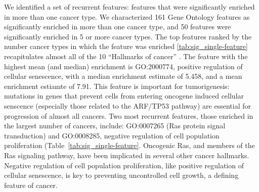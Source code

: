 We identified a set of recurrent features: features that were significantly enriched in more than one cancer type.  We characterized 161 Gene Ontology features as significantly enriched in more than one cancer type, and 50 features were significantly enriched in 5 or more cancer types.  The top features ranked by the number cancer types in which the feature was enriched \ref{tab:sig_single-feature} recapitulates almost all of the 10 ``Hallmarks of cancer''
\cite{Hanahan_2011}.  The feature with the highest mean (and median) enrichment is GO:2000774, positive regulation of cellular senescence, with a median enrichment estimate of 5.458, and a mean enrichment estiamte of 7.91.  %
This feature is important for tumorigenesis: mutations in genes that prevent cells from entering oncogene induced cellular senscence (especially those related to the ARF/TP53 pathway) are essential for progression of almost all cancers\cite{chandeck10_oncog_induc_cellul_senes}.  %
Two most recurrent features, those enriched in the largest number of cancers, include: GO:0007265 (Ras protein signal transduction) and GO:0008285, negative regulation of cell population proliferation (Table~\ref{tab:sig_single-feature}. %
Oncogenic Ras, and members of the Ras signaling pathway, have been implicated in several other cancer hallmarks\cite{Pylayeva_Gupta_2011}.  %
Negative regulation of cell population proliferation, like positive regulation of cellular senescence, is key to preventing uncontrolled cell growth, a defining feature of cancer\cite{Hanahan_2011}.
 
